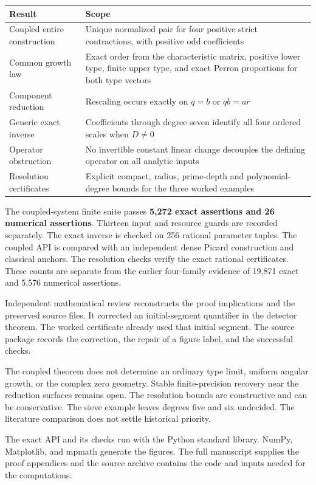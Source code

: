\renewcommand{\arraystretch}{1.28}
\begin{tabular}{@{}p{.28\linewidth}p{.65\linewidth}@{}}
\toprule
Result & Scope\\\midrule
Coupled entire construction & Unique normalized pair for four positive strict contractions, with positive odd coefficients\\
Common growth law & Exact order from the characteristic matrix, positive lower type, finite upper type, and exact Perron proportions for both type vectors\\
Component reduction & Rescaling occurs exactly on $q=b$ or $qb=ar$\\
Generic exact inverse & Coefficients through degree seven identify all four ordered scales when $D\ne0$\\
Operator obstruction & No invertible constant linear change decouples the defining operator on all analytic inputs\\
Resolution certificates & Explicit compact, radius, prime-depth and polynomial-degree bounds for the three worked examples\\
\bottomrule
\end{tabular}

The coupled-system finite suite passes \textbf{5,272 exact assertions and 26 numerical
assertions}. Thirteen input and resource guards are recorded separately.
The exact inverse is checked on 256 rational parameter tuples. The coupled
API is compared with an independent dense Picard construction and classical
anchors. The resolution checks verify the exact rational certificates.
These counts are separate from the earlier four-family evidence of 19,871 exact
and 5,576 numerical assertions.

Independent mathematical review reconstructs the proof implications and the
preserved source files. It corrected an initial-segment quantifier in the
detector theorem. The worked certificate already used that initial segment.
The source package records the correction, the repair of a figure label, and the successful checks.

The coupled theorem does not determine an ordinary type limit, uniform angular
growth, or the complex zero geometry. Stable finite-precision recovery near the
reduction surfaces remains open. The resolution bounds are constructive and
can be conservative. The sieve example leaves degrees five and six undecided.
The literature comparison does not settle historical priority.

The exact API and its checks run with the Python standard library. NumPy, Matplotlib, and
mpmath generate the figures. The full manuscript supplies the proof
appendices and the source archive contains the code and inputs needed for the computations.
